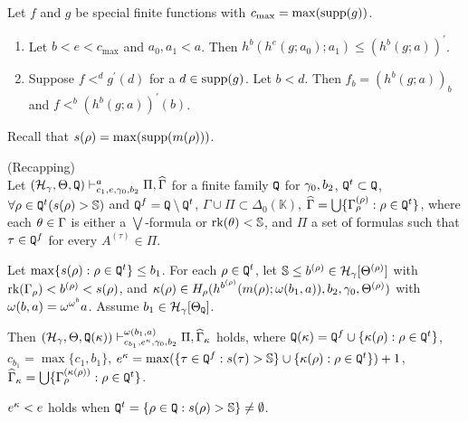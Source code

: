 \documentclass{article}
\newcommand{\mS}{\mathbb{S}}
\begin{document}
\bprp\label{prp:hstepdown}
Let $f$ and $g$ be special finite functions with $c_{\max}=\max({\rm supp}(g))$.

\begin{enumerate}

\item\label{prp:hstepdown.1}
Let $b<e<c_{\max}$ and $a_{0},a_{1}<a$.
Then
$h^{b}(h^{e}(g;a_{0});a_{1})\leq (h^{b}(g;a))^{\prime}$.

\item\label{prp:hstepdown.2}
Suppose
$f<^{d}g^{\prime}(d)$ for a $d\in{\rm supp}(g)$.
Let $b<d$.
Then $f_{b}=(h^{b}(g;a))_{b}$ and
$f<^{b}(h^{b}(g;a))^{\prime}(b)$.

\end{enumerate}
\eprp




Recall that $s(\rho)=\max({\rm supp}(m(\rho)))$.

\blem\label{lem:recappingpi11}{\rm (Recapping)}\\
Let $
(\mathcal{H}_{\gamma},\Theta,{\tt Q})
\vdash^{a}_{c_{1},e,\gamma_{0},b_{2}}
\Pi,\widehat{\Gamma}
$
for a finite family ${\tt Q}$ for $\gamma_{0}, b_{2}$, 
${\tt Q}^{t}\subset{\tt Q}$, $\fal\rho\in{\tt Q}^{t}(s(\rho)>\mS)$
and
${\tt Q}^{f}={\tt Q}\setminus{\tt Q}^{t}$, 
$\Gamma\cup\Pi\subset\Delta_{0}(\mathbb{K})$,
$\widehat{\Gamma}=\bigcup\{\Gamma_{\rho}^{(\rho)} :\rho\in{\tt Q}^{t}\}$,
where
each $\theta\in \Gamma$ is either a $\bigvee$-formula or $\rk(\tht)<\mS$,
and
$\Pi$ a set of formulas such that $\tau\in{\tt Q}^{f}$ for every $A^{(\tau)}\in\Pi$.

Let $\max\{s(\rho):\rho\in{\tt Q}^{t}\}\leq b_{1}$.
For each $\rho\in{\tt Q}^{t}$, let $\mS\leq b^{(\rho)}\in\calh_{\gam}[\Tht^{(\rho)}]$ 
with $\mbox{{\rm rk}}(\Gamma_{\rho})<b^{(\rho)}<s(\rho)$, and
$\kappa(\rho)\in H_{\rho}(h^{b^{(\rho)}}(m(\rho);\omega(b_{1},a)),b_{2}, \gamma_{0},\Theta^{(\rho)})$
 with $\omega(b,a)=\omega^{\omega^{b}}a$.
Assume 
$b_{1}\in{\cal H}_{\gamma}[\Theta_{{\tt Q}}]$.

Then 
$
(\mathcal{H}_{\gamma},\Theta,{\tt Q}(\kappa)
)
\vdash^{\omega(b_{1},a)}_{c_{b_{1}},e^{\kappa}, \gamma_{0},b_{2}}
\Pi,\widehat{\Gamma}_{\kappa}
$
holds,
where ${\tt Q}(\kappa)={\tt Q}^{f}\cup\{\kappa(\rho):\rho\in{\tt Q}^{t}\}$,
$c_{b_{1}}=\max\{c_{1},b_{1}\}$,
$e^{\kap}=\max(\{\tau\in{\tt Q}^{f} : s(\tau)>\mS\}\cup\{\kap(\rho): \rho\in{\tt Q}^{t}\})+1$,
$\widehat{\Gamma}_{\kappa}=\bigcup\{\Gamma_{\rho}^{(\kappa(\rho))}:\rho\in{\tt Q}^{t}\}$.

$e^{\kappa}<e$ holds
when
${\tt Q}^{t}=\{\rho\in{\tt Q}: s(\rho)>\mS\}\neq\emptyset$.
\end{document}
